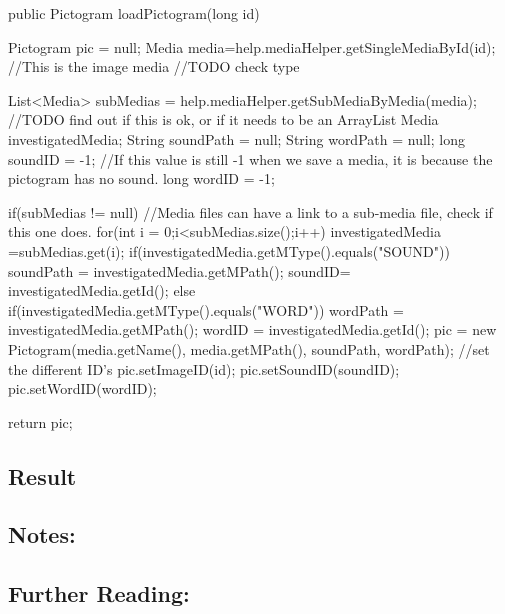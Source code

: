 \begin{source}{}
	public Pictogram loadPictogram(long id)
	{
		Pictogram pic = null;
		Media media=help.mediaHelper.getSingleMediaById(id); //This is the image media //TODO check type

		List<Media> subMedias =	help.mediaHelper.getSubMediaByMedia(media); //TODO find out if this is ok, or if it needs to be an ArrayList
		Media investigatedMedia;
		String soundPath = null;
		String wordPath = null;
		long soundID = -1; //If this value is still -1 when we save a media, it is because the pictogram has no sound.
		long wordID = -1;

		if(subMedias != null)	//Media files can have a link to a sub-media file, check if this one does.
		{
			for(int i = 0;i<subMedias.size();i++) 		
			{
				investigatedMedia =subMedias.get(i);
				if(investigatedMedia.getMType().equals("SOUND"))
				{
					soundPath = investigatedMedia.getMPath();
					soundID= investigatedMedia.getId();
				}
				else if(investigatedMedia.getMType().equals("WORD"))
				{
					wordPath = investigatedMedia.getMPath();
					wordID = investigatedMedia.getId();
				}
			}
		}
		pic = new Pictogram(media.getName(), media.getMPath(), soundPath, wordPath);
		//set the different ID's
		pic.setImageID(id);
		pic.setSoundID(soundID);
		pic.setWordID(wordID);

		return pic;
	}

\end{source}

\subsection{Result}


\subsection{Notes:}


\subsection{Further Reading:}